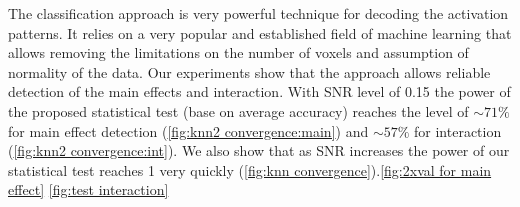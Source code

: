 The classification approach is very powerful technique for decoding the activation patterns. It relies on a very popular and established field of machine learning that allows removing the limitations on the number of voxels and assumption of normality of the data. Our experiments show that the approach allows reliable detection of the main effects and interaction. With SNR level of 0.15 the power of the proposed statistical test (base on average accuracy) reaches the level of $\sim71\%$ for main effect detection (\autoref{fig:knn2 convergence:main}) and $\sim57\%$ for interaction (\autoref{fig:knn2 convergence:int}). We also show that as SNR increases the power of our statistical test reaches 1 very quickly (\autoref{fig:knn convergence}).\autoref{fig:2xval for main effect}  \autoref{fig:test interaction}
